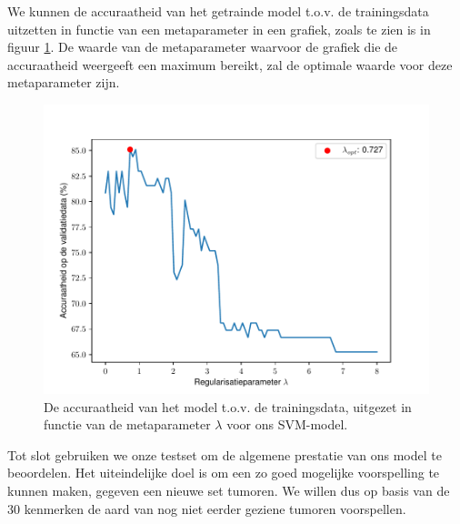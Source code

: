 \documentclass[TeamE-eindrapport]{subfiles}
\begin{document}
	We kunnen de accuraatheid van het getrainde model t.o.v. de trainingsdata uitzetten in functie van een metaparameter in een grafiek, zoals te zien is in figuur \ref{fig:metaparameter}. De waarde van de metaparameter waarvoor de grafiek die de accuraatheid weergeeft een maximum bereikt, zal de optimale waarde voor deze metaparameter zijn.
	
	\begin{figure}
		\centering
		\includegraphics{accuraatheid}
		\caption{De accuraatheid van het model t.o.v. de trainingsdata, uitgezet in functie van de metaparameter \(\lambda\) voor ons SVM-model.}
		\label{fig:metaparameter}
	\end{figure}
	
	Tot slot gebruiken we onze testset om de algemene prestatie van ons model te beoordelen. Het uiteindelijke doel is om een zo goed mogelijke voorspelling te kunnen maken, gegeven een nieuwe set tumoren. We willen dus op basis van de 30 kenmerken de aard van nog niet eerder geziene tumoren voorspellen.
		

	
\end{document}
